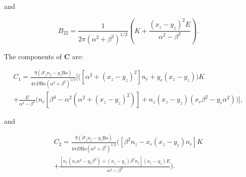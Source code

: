 \documentclass[12pt]{article}
\begin{document}
and 

\begin{equation}
\label{equ:B22_comp}
B_{22} = \frac{1}{2 \pi (\alpha^{2} + \beta^{2})^{1/2}} \left(K + \frac{(x_{z} - y_{z})^{2} E}{\alpha^{2} - \beta^{2}}\right).
\end{equation}

The components of $\boldsymbol{C}$ are:

\begin{align}
\label{equ:C1_comp}
C_{1} = \frac{9 (\partial'_{j} n_{j} - y_{z} \text{Bo})}{4 \pi D \text{Bo} (\alpha^{2} + \beta^{2})^{1/2}} \bigg[ \bigg( [\alpha^{2} + (x_{z} - y_{z})^{2}] n_{r} + y_{r} (x_{z} - y_{z}) \bigg) K \nonumber \\
+ \frac{E}{\alpha^{2} - \beta^{2}} \bigg( n_{r} [\beta^{4} - \alpha^{2} (\alpha^{2} + (x_{z} - y_{z})^{2})] + n_{z} (x_{z} - y_{z}) (x_{r} \beta^{2} - y_{r} \alpha^{2}) \bigg) \bigg],
\end{align}

and 

\begin{align}
\label{equ:C2_comp}
C_{2} = \frac{9 (\partial'_{j} n_{j} - y_{z} \text{Bo})}{4 \pi D \text{Bo} (\alpha^{2} + \beta^{2})^{1/2}}  \bigg( [\beta^{2} n_{z} - x_{r} (x_{z} - y_{z}) n_{r}] K \nonumber \\
+ \frac{[n_{r} (x_{r} \alpha^{2} - y_{r} \beta^{2}) + (x_{z} - y_{z}) \beta^{2} n_{z}] (x_{z} - y_{z}) E}{\alpha^{2} - \beta^{2}}\bigg).
\end{align}




\end{document}
